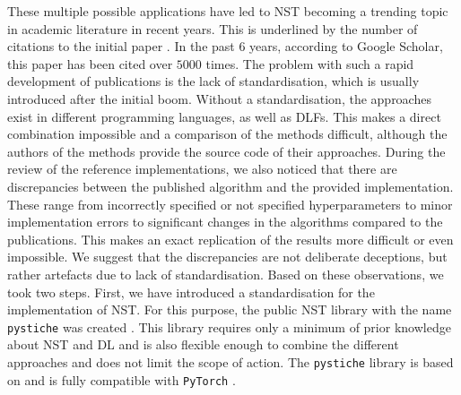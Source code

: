 These multiple possible applications have led to \gls{NST} becoming a trending topic in academic literature in recent years. This is underlined by the number of citations to the initial paper  \cite{GEB2016}. In the past $6$ years, according to Google Scholar, this paper has been cited over $5000$ times. The problem with such a rapid development of publications is the lack of standardisation, which is usually introduced after the initial boom. Without a standardisation, the approaches exist in different programming languages, as well as \glspl{DLF}. This makes a direct combination impossible and a comparison of the methods difficult, although the authors of the methods provide the source code of their approaches. During the review of the reference implementations, we also noticed that there are discrepancies between the published algorithm and the provided implementation. These range from incorrectly specified or not specified hyperparameters to minor implementation errors to significant changes in the algorithms compared to the publications. This makes an exact replication of the results more difficult or even impossible. We suggest that the discrepancies are not deliberate deceptions, but rather artefacts due to lack of standardisation. Based on these observations, we took two steps. First, we have introduced a standardisation for the implementation of \gls{NST}. For this purpose, the public \gls{NST} library with the name \texttt{pystiche} was created \cite{ML2020}. This library requires only a minimum of prior knowledge about \gls{NST} and \gls{DL} and is also flexible enough to combine the different approaches and does not limit the scope of action. The \texttt{pystiche} library is based on and is fully compatible with \texttt{PyTorch} \cite{PGM+2019}. 

